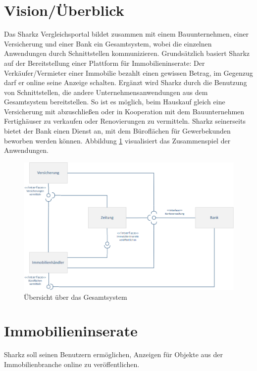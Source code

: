 \documentclass[a4paper]{scrreprt}
\begin{document}
\section{Vision/Überblick}
Das Sharkz Vergleichsportal bildet zusammen mit einem Bauunternehmen, einer Versicherung und einer Bank ein Gesamtsystem, wobei die einzelnen Anwendungen durch Schnittstellen kommunizieren.
\newline
\newline
Grundsätzlich basiert Sharkz auf der Bereitstellung einer Plattform für Immobilieninserate: Der Verkäufer/Vermieter einer Immobilie bezahlt einen gewissen Betrag, im Gegenzug darf er online seine Anzeige schalten.
\newline
\newline
Ergänzt wird Sharkz durch die Benutzung von Schnittstellen, die andere Unternehmensanwendungen aus dem Gesamtsystem bereitstellen. So ist es möglich, beim Hauskauf gleich eine Versicherung mit abzuschließen oder in Kooperation mit dem Bauunternehmen Fertighäuser zu verkaufen oder Renovierungen zu vermitteln.
\newline
Sharkz seinerseits bietet der Bank einen Dienst an, mit dem Büroflächen für Gewerbekunden beworben werden können. Abbildung \ref{fig:gesamtsystem} visualisiert das Zusammenspiel der Anwendungen.

\begin{figure}[h]
\centering
\includegraphics[scale=0.6]{pics/diagrams/gesamtsystem.png}
\caption{Übersicht über das Gesamtsystem}
\label{fig:gesamtsystem}
\end{figure}

\section{Immobilieninserate}
Sharkz soll seinen Benutzern ermöglichen, Anzeigen für Objekte aus der Immobilienbranche online zu veröffentlichen.
\end{document}
